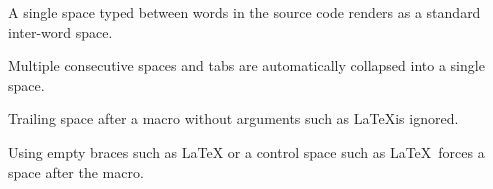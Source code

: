 A single space typed between words in the source code renders as a standard inter-word space.

Multiple          consecutive            spaces and 				tabs are automatically collapsed into a single space.

Trailing space after a macro without arguments such as \LaTeX is ignored.

Using empty braces such as \LaTeX{} or a control space such as \LaTeX\ forces a space after the macro.